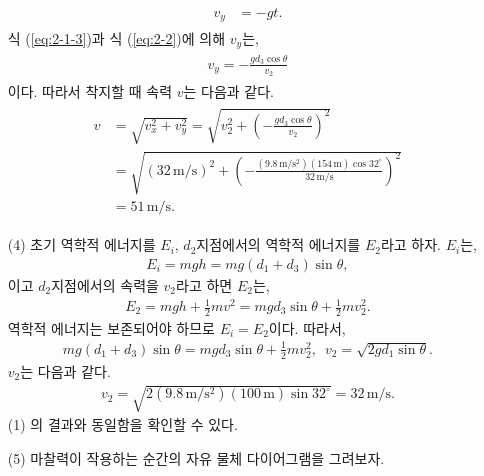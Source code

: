 \documentclass[floatfix,nofootinbib,superscriptaddress,fleqn]{revtex4-2}
\begin{document}
\begin{itemize}
\begin{align}
\begin{split}
      v_y &= -gt.
    \end{split}
  \end{align} 
  식 (\ref{eq:2-1-3})과 식 (\ref{eq:2-2})에 의해 $v_y$는,
  \begin{align}
    \begin{split}
      v_y = -\frac{gd_3\cos{\theta}}{v_2}
    \end{split}
  \end{align}
  이다. 따라서 착지할 때 속력 $v$는 다음과 같다.
  \begin{align}
    \begin{split}
      v &= \sqrt{v_x^2+v_y^2} = \sqrt{v_2^2+\left(
      -\frac{gd_3\cos{\theta}}{v_2}\right)^2} \\
      &= \sqrt{(32\,\mathrm{m/s})^2+\left(
        -\frac{(9.8\,\mathrm{m/s^2})(154\,\mathrm{m})
        \cos{32^\circ}}{32\,\mathrm{m/s}}\right)^2} \\
      &= 51\,\mathrm{m/s}.
      \end{split}
  \end{align}
  \item[(4)] 초기 역학적 에너지를 $E_i$, 
  $d_2$지점에서의 역학적 에너지를 $E_2$라고 하자. $E_i$는,
  \begin{align}
    E_i = mgh =mg\left(d_1+d_3\right)\sin{\theta},
  \end{align}
  이고 $d_2$지점에서의 속력을 $v_2$라고 하면 $E_2$는,
  \begin{align}
    E_2 = mgh + \frac{1}{2}mv^2
    = mgd_3\sin{\theta} + \frac{1}{2}mv_2^2.
  \end{align}
  역학적 에너지는 보존되어야 하므로 $E_i=E_2$이다. 따라서,
  \begin{align}
    mg\left(d_1+d_3\right)\sin{\theta}
    =mgd_3\sin{\theta} + \frac{1}{2}mv_2^2,\,\,\,
    v_2 = \sqrt{2gd_1\sin{\theta}}.
  \end{align}
  $v_2$는 다음과 같다.
  \begin{align}
    v_2 = \sqrt{2(9.8\,\mathrm{m/s^2})(100\,\mathrm{m})\sin{32^\circ}}
    = 32\,\mathrm{m/s}.
  \end{align} 
 (1) 의 결과와 동일함을 확인할 수 있다.
  \item[(5)] 
  마찰력이 작용하는 순간의 자유 물체 다이어그램을 그려보자. 
  \begin{figure}[h]
\end{figure}
\end{itemize}
\end{document}
